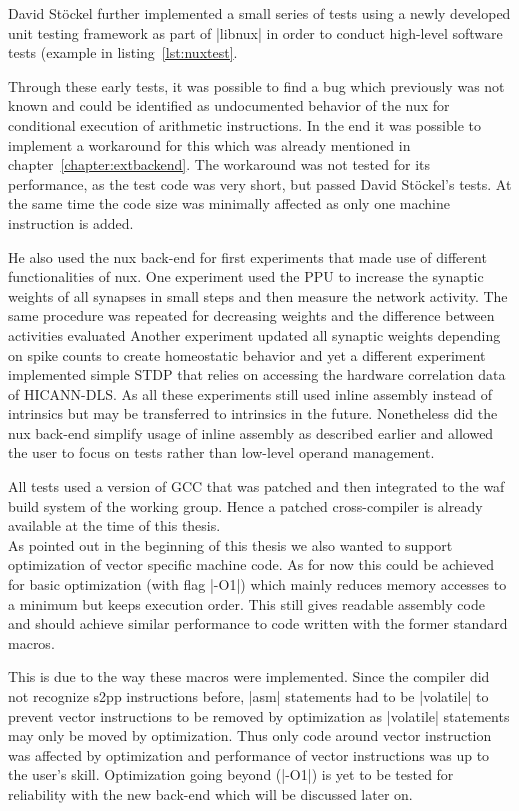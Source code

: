 David Stöckel further implemented a small series of tests using a newly developed unit testing framework as part of |libnux| in order to conduct high-level software tests (example in listing~\ref{lst:nuxtest}.

Through these early tests, it was possible to find a bug which previously was not known and could be identified as undocumented behavior of the nux for conditional execution of arithmetic instructions.
In the end it was possible to implement a workaround for this which was already mentioned in chapter~\ref{chapter:extbackend}.
The workaround was not tested for its performance, as the test code was very short, but passed David Stöckel's tests.
At the same time the code size was minimally affected as only one machine instruction is added.

He also used the nux back-end for first experiments that made use of different functionalities of nux.
One experiment used the \ac{PPU} to increase the synaptic weights of all synapses in small steps and then measure the network activity.
The same procedure was repeated for decreasing weights and the difference between activities evaluated
Another experiment updated all synaptic weights depending on spike counts to create homeostatic behavior and yet a different experiment implemented simple \ac{STDP} that relies on accessing the hardware correlation data of \ac{HICANN-DLS}.
As all these experiments still used inline assembly instead of intrinsics but may be transferred to intrinsics in the future.
Nonetheless did the nux back-end simplify usage of inline assembly as described earlier and allowed the user to focus on tests rather than low-level operand management.

All tests used a version of \ac{GCC} that was patched and then integrated to the waf build system of the working group.
Hence a patched cross-compiler is already available at the time of this thesis.
\\
As pointed out in the beginning of this thesis we also wanted to support optimization of vector specific machine code.
As for now this could be achieved for basic optimization (with flag |-O1|) which mainly reduces memory accesses to a minimum but keeps execution order.
This still gives readable assembly code and should achieve similar performance to code written with the former standard macros.

This is due to the way these macros were implemented.
Since the compiler did not recognize \ac{s2pp} instructions before, |asm| statements had to be |volatile| to prevent vector instructions to be removed by optimization as |volatile| statements may only be moved by optimization.
Thus only code around vector instruction was affected by optimization and performance of vector instructions was up to the user's skill.
Optimization going beyond (|-O1|) is yet to be tested for reliability with the new back-end which will be discussed later on.

